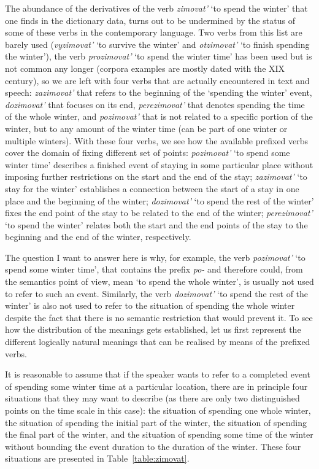 The abundance of the derivatives of the verb \textit{zimovat'} `to spend the winter' that one finds in the dictionary data, turns out to be undermined by the status of some of these verbs in the contemporary language. Two verbs from this list are barely used (\textit{vyzimovat'} `to survive the winter' and \textit{otzimovat'} `to finish spending the winter'), the verb \textit{prozimovat'} `to spend the winter time' has been used but is not common any longer (corpora examples are mostly dated with the XIX century), so we are left with four verbs that are actually encountered in text and speech: \textit{zazimovat'} that refers to the beginning of the `spending the winter' event, \textit{dozimovat'} that focuses on its end, \textit{perezimovat'} that denotes spending the time of the whole winter, and \textit{pozimovat'} that is not related to a specific portion of the winter, but to any amount of the winter time (can be part of one winter or multiple winters). With these four verbs, we see how the available prefixed verbs cover the domain of fixing different set of points: \textit{pozimovat'} `to spend some winter time' describes a finished event of staying in some particular place without imposing further restrictions on the start and the end of the stay; \textit{zazimovat'} `to stay for the winter' establishes a connection between the start of a stay in one place and the beginning of the winter; \textit{dozimovat'} `to spend the rest of the winter' fixes the end point of the stay to be related to the end of the winter; \textit{perezimovat'} `to spend the winter' relates both the start and the end points of the stay to the beginning and the end of the winter, respectively.

The question I want to answer here is why, for example, the verb \textit{pozimovat'} `to spend some winter time', that contains the prefix \textit{po-} and therefore could, from the semantics point of view, mean `to spend the whole winter', is usually not used to refer to such an event. Similarly, the verb \textit{dozimovat'} `to spend the rest of the winter' is also not used to refer to the situation of spending the whole winter despite the fact that there is no semantic restriction that would prevent it. To see how the distribution of the meanings gets established, let us first represent the different logically natural meanings that can be realised by means of the prefixed verbs. 

It is reasonable to assume that if the speaker wants to refer to a completed event of spending some winter time at a particular location, there are in principle four situations that they may want to describe (as there are only two distinguished points on the time scale in this case): the situation of spending one whole winter, the situation of spending the initial part of the winter, the situation of spending the final part of the winter, and the situation of spending some time of the winter without bounding the event duration to the duration of the winter. These four situations are presented in Table~\ref{table:zimovat}.

